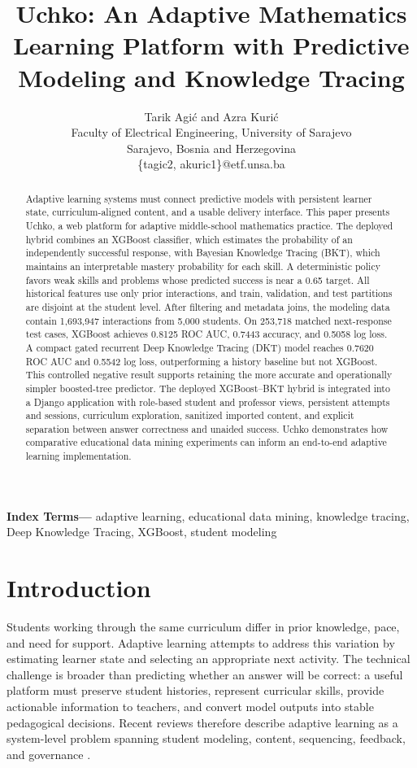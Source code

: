 \documentclass[conference]{IEEEtran}
\title{Uchko: An Adaptive Mathematics Learning Platform with Predictive Modeling and Knowledge Tracing}
\author{
\ifdefined\ieeeavailable
\IEEEauthorblockN{Tarik Agi\'{c} and Azra Kuri\'{c}}
\IEEEauthorblockA{Faculty of Electrical Engineering, University of Sarajevo\\
Sarajevo, Bosnia and Herzegovina\\
\{tagic2, akuric1\}@etf.unsa.ba}
\else
Tarik Agi\'{c} and Azra Kuri\'{c}\\
\small Faculty of Electrical Engineering, University of Sarajevo\\
\small Sarajevo, Bosnia and Herzegovina\\
\small \{tagic2, akuric1\}@etf.unsa.ba
\fi
}
\date{}
\newenvironment{IEEEkeywords}{\par\small\noindent\textbf{Index Terms---}}{\par}
\begin{document}
\maketitle

\begin{abstract}
Adaptive learning systems must connect predictive models with persistent learner state, curriculum-aligned content, and a usable delivery interface. This paper presents Uchko, a web platform for adaptive middle-school mathematics practice. The deployed hybrid combines an XGBoost classifier, which estimates the probability of an independently successful response, with Bayesian Knowledge Tracing (BKT), which maintains an interpretable mastery probability for each skill. A deterministic policy favors weak skills and problems whose predicted success is near a 0.65 target. All historical features use only prior interactions, and train, validation, and test partitions are disjoint at the student level. After filtering and metadata joins, the modeling data contain 1,693,947 interactions from 5,000 students. On 253,718 matched next-response test cases, XGBoost achieves 0.8125 ROC AUC, 0.7443 accuracy, and 0.5058 log loss. A compact gated recurrent Deep Knowledge Tracing (DKT) model reaches 0.7620 ROC AUC and 0.5542 log loss, outperforming a history baseline but not XGBoost. This controlled negative result supports retaining the more accurate and operationally simpler boosted-tree predictor. The deployed XGBoost--BKT hybrid is integrated into a Django application with role-based student and professor views, persistent attempts and sessions, curriculum exploration, sanitized imported content, and explicit separation between answer correctness and unaided success. Uchko demonstrates how comparative educational data mining experiments can inform an end-to-end adaptive learning implementation.
\end{abstract}

\begin{IEEEkeywords}
adaptive learning, educational data mining, knowledge tracing, Deep Knowledge Tracing, XGBoost, student modeling
\end{IEEEkeywords}

\section{Introduction}
Students working through the same curriculum differ in prior knowledge, pace, and need for support. Adaptive learning attempts to address this variation by estimating learner state and selecting an appropriate next activity. The technical challenge is broader than predicting whether an answer will be correct: a useful platform must preserve student histories, represent curricular skills, provide actionable information to teachers, and convert model outputs into stable pedagogical decisions. Recent reviews therefore describe adaptive learning as a system-level problem spanning student modeling, content, sequencing, feedback, and governance \cite{kabudi2021adaptive,tan2025platforms}.
\end{document}
